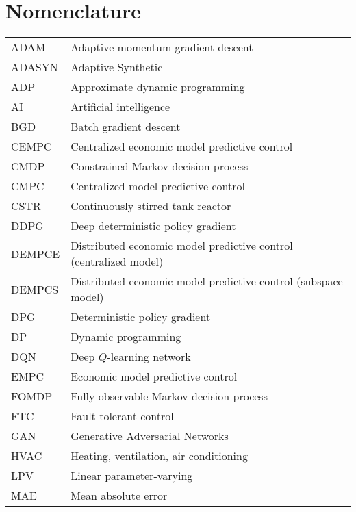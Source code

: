\documentclass[12pt]{report}
\begin{document}
\chapter*{Nomenclature}
\noindent 
\begin{tabular}{@{}ll}
ADAM & Adaptive momentum gradient descent \\
ADASYN & Adaptive Synthetic \\
ADP & Approximate dynamic programming \\
AI & Artificial intelligence \\
BGD & Batch gradient descent \\
CEMPC & Centralized economic model predictive control \\
CMDP & Constrained Markov decision process \\
CMPC & Centralized model predictive control \\
CSTR & Continuously stirred tank reactor \\
DDPG & Deep deterministic policy gradient \\
DEMPCE & Distributed economic model predictive control (centralized model) \\
DEMPCS & Distributed economic model predictive control (subspace model) \\
DPG & Deterministic policy gradient \\
DP & Dynamic programming \\
DQN & Deep $Q$-learning network \\
EMPC & Economic model predictive control \\
FOMDP & Fully observable Markov decision process \\
FTC & Fault tolerant control \\
GAN & Generative Adversarial Networks \\
HVAC & Heating, ventilation, air conditioning \\
LPV & Linear parameter-varying \\
MAE & Mean absolute error \\
\end{tabular}
\end{document}
